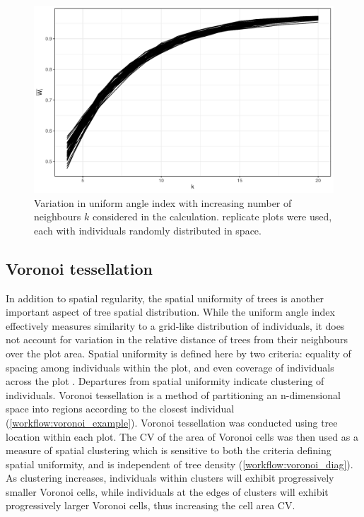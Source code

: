 \begin{refsection}
\begin{figure}
\centering
	\includegraphics[width=\linewidth]{img/wi_k}
	\caption[Behaviour of uniform angle index with increasing number of neighbours considered]{Variation in uniform angle index with increasing number of neighbours $k$ considered in the calculation. \wikn{} replicate plots were used, each with \wiki{} individuals randomly distributed in space.}
	\label{workflow:wi_k}
\end{figure}

\subsection{Voronoi tessellation}
\label{workflow:ssec:voronoi}

In addition to spatial regularity, the spatial uniformity of trees is another important aspect of tree spatial distribution. While the uniform angle index effectively measures similarity to a grid-like distribution of individuals, it does not account for variation in the relative distance of trees from their neighbours over the plot area. Spatial uniformity is defined here by two criteria: equality of spacing among individuals within the plot, and even coverage of individuals across the plot \citep{Ong2012}. Departures from spatial uniformity indicate clustering of individuals. Voronoi tessellation is a method of partitioning an n-dimensional space into regions according to the closest individual (\autoref{workflow:voronoi_example}). Voronoi tessellation was conducted using tree location within each plot. The CV of the area of Voronoi cells was then used as a measure of spatial clustering which is sensitive to both the criteria defining spatial uniformity, and is independent of tree density (\autoref{workflow:voronoi_diag}). As clustering increases, individuals within clusters will exhibit progressively smaller Voronoi cells, while individuals at the edges of clusters will exhibit progressively larger Voronoi cells, thus increasing the cell area CV.


\end{refsection}

